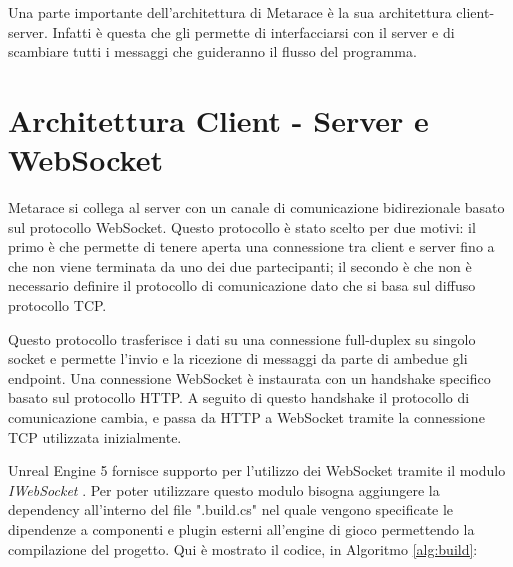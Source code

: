 


Una parte importante dell'architettura di Metarace è la sua architettura client-server.
%
Infatti è questa che gli permette di interfacciarsi con il server e di scambiare tutti i messaggi che guideranno il flusso del programma.

\section{Architettura Client - Server e WebSocket}

Metarace si collega al server con un canale di comunicazione bidirezionale basato sul protocollo WebSocket.
%
Questo protocollo è stato scelto per due motivi: il primo è che permette di tenere aperta una connessione tra client e server fino a che non viene terminata da uno dei due partecipanti; il secondo è che non è necessario definire il protocollo di comunicazione dato che si basa sul diffuso protocollo TCP.

Questo protocollo trasferisce i dati su una connessione full-duplex su singolo socket e permette l'invio e la ricezione di messaggi da parte di ambedue gli endpoint. 
%
Una connessione WebSocket è instaurata con un handshake specifico basato sul protocollo HTTP.
%
A seguito di questo handshake il protocollo di comunicazione cambia, e passa da HTTP a WebSocket tramite la connessione TCP utilizzata inizialmente. 

Unreal Engine 5 fornisce supporto per l'utilizzo dei WebSocket tramite il modulo \textit{IWebSocket} \cite{UWebSocket}. Per poter utilizzare questo modulo bisogna aggiungere la dependency all'interno del file ".build.cs" nel quale vengono specificate le dipendenze a componenti e plugin esterni all'engine di gioco permettendo la compilazione del progetto. Qui è mostrato il codice, in Algoritmo \ref{alg:build}:

